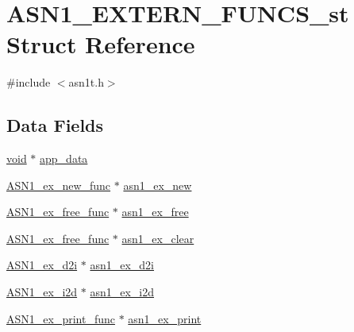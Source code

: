 \hypertarget{struct_a_s_n1___e_x_t_e_r_n___f_u_n_c_s__st}{}\section{A\+S\+N1\+\_\+\+E\+X\+T\+E\+R\+N\+\_\+\+F\+U\+N\+C\+S\+\_\+st Struct Reference}
\label{struct_a_s_n1___e_x_t_e_r_n___f_u_n_c_s__st}


{\ttfamily \#include $<$asn1t.\+h$>$}

\subsection*{Data Fields}
\begin{DoxyCompactItemize}
\item 
\hyperlink{hw__4758__cca_8h_afad4d591c7931ff6dc5bf69c76c96aa0}{void} $\ast$ \hyperlink{struct_a_s_n1___e_x_t_e_r_n___f_u_n_c_s__st_a2d755a5df39e3da5ae2a0630fbe24c41}{app\+\_\+data}
\item 
\hyperlink{include_2openssl_2asn1t_8h_a974a90edb24a690e5e664128a975412e}{A\+S\+N1\+\_\+ex\+\_\+new\+\_\+func} $\ast$ \hyperlink{struct_a_s_n1___e_x_t_e_r_n___f_u_n_c_s__st_a1f7abce1cb756a4c8778afbef307b78b}{asn1\+\_\+ex\+\_\+new}
\item 
\hyperlink{include_2openssl_2asn1t_8h_a98b861bda8c86873a9d02978fcba10cf}{A\+S\+N1\+\_\+ex\+\_\+free\+\_\+func} $\ast$ \hyperlink{struct_a_s_n1___e_x_t_e_r_n___f_u_n_c_s__st_adbf62bb94fd1051c1ad89543049cff61}{asn1\+\_\+ex\+\_\+free}
\item 
\hyperlink{include_2openssl_2asn1t_8h_a98b861bda8c86873a9d02978fcba10cf}{A\+S\+N1\+\_\+ex\+\_\+free\+\_\+func} $\ast$ \hyperlink{struct_a_s_n1___e_x_t_e_r_n___f_u_n_c_s__st_a66f59171163636323b79dd0e2a3c5fd7}{asn1\+\_\+ex\+\_\+clear}
\item 
\hyperlink{include_2openssl_2asn1t_8h_a664088a4b0e2ebbfea6565bbc5418fc0}{A\+S\+N1\+\_\+ex\+\_\+d2i} $\ast$ \hyperlink{struct_a_s_n1___e_x_t_e_r_n___f_u_n_c_s__st_ab29f0beb8aa7f489c6228f19835e9d5a}{asn1\+\_\+ex\+\_\+d2i}
\item 
\hyperlink{include_2openssl_2asn1t_8h_a21b1e839f19dc49f6d7dc03bd9234cc6}{A\+S\+N1\+\_\+ex\+\_\+i2d} $\ast$ \hyperlink{struct_a_s_n1___e_x_t_e_r_n___f_u_n_c_s__st_aaf777948f0332fc3495f43d7e0e6cfcd}{asn1\+\_\+ex\+\_\+i2d}
\item 
\hyperlink{include_2openssl_2asn1t_8h_aeecb5cffbc57ff964405d46408ae0e45}{A\+S\+N1\+\_\+ex\+\_\+print\+\_\+func} $\ast$ \hyperlink{struct_a_s_n1___e_x_t_e_r_n___f_u_n_c_s__st_a6706b8c2bdb20edf184116dff6f15ecb}{asn1\+\_\+ex\+\_\+print}
\end{DoxyCompactItemize}



